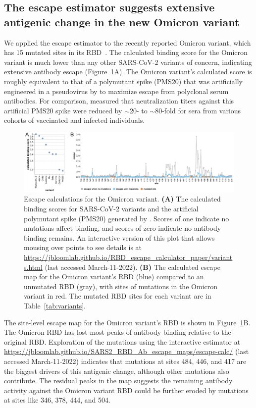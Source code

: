 \documentclass[9pt,twocolumn,twoside]{gsajnl_modified}
\begin{document}
\subsection{The escape estimator suggests extensive antigenic change in the new Omicron variant}
We applied the escape estimator to the recently reported Omicron variant, which has 15 mutated sites in its RBD~\citep{ngs-sa2021update,deoliveira2021tweet}.
The calculated binding score for the Omicron variant is much lower than any other SARS-CoV-2 variants of concern, indicating extensive antibody escape (Figure~\ref{fig:Omicron}A).
The Omicron variant's calculated score is roughly equivalent to that of a polymutant spike (PMS20) that was artificially engineered in a pseudovirus by \citet{schmidt2021high} to maximize escape from polyclonal serum antibodies.
For comparison, \citet{schmidt2021high} measured that neutralization titers against this artificial PMS20 spike were reduced by $\sim$20- to $\sim$80-fold for sera from various cohorts of vaccinated and infected individuals.

\begin{figure}
\includegraphics[width=\linewidth]{figures/Omicron/Omicron.pdf}
\caption{Escape calculations for the Omicron variant.
{\bf (A)} The calculated binding scores for SARS-CoV-2 variants and the artificial polymutant spike (PMS20) generated by \citet{schmidt2021high}.
Scores of one indicate no mutations affect binding, and scores of zero indicate no antibody binding remains.
An interactive version of this plot that allows mousing over points to see details is at \url{https://jbloomlab.github.io/RBD_escape_calculator_paper/variants.html} (last accessed March-11-2022).
{\bf (B)} The calculated escape map for the Omicron variant's RBD (blue) compared to an unmutated RBD (gray), with sites of mutations in the Omicron variant in red.
The mutated RBD sites for each variant are in Table~\ref{tab:variants}.
}
\label{fig:Omicron}
\end{figure}

The site-level escape map for the Omicron variant's RBD is shown in Figure~\ref{fig:Omicron}B.
The Omicron RBD has lost most peaks of antibody binding relative to the original RBD.
Exploration of the mutations using the interactive estimator at \url{https://jbloomlab.github.io/SARS2_RBD_Ab_escape_maps/escape-calc/} (last accessed March-11-2022) indicates that mutations at sites 484, 446, and 417 are the biggest drivers of this antigenic change, although other mutations also contribute.
The residual peaks in the map suggests the remaining antibody activity against the Omicron variant RBD could be further eroded by mutations at sites like 346, 378, 444, and 504.
\end{document}
